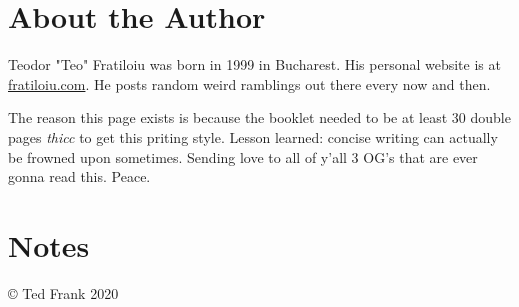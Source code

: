 \documentclass[11pt]{report}
\begin{document}
\newpage
\pagestyle{plain}

\newpage
\mbox{}
\newpage

\newpage
{}
\listoffigures
\newpage
{}
\listoftables

\newpage
\mbox{}
\newpage
\newpage
{}
\printbibliography

\newpage
\mbox{}
\newpage

\newpage
\section*{About the Author}
Teodor "Teo" Fratiloiu was born in 1999 in Bucharest. His personal website is at \href{fratiloiu.com}{fratiloiu.com}. He posts random weird ramblings out there every now and then. 
\par
The reason this page exists is because the booklet needed to be at least 30 double pages \textit{thicc} to get this priting style. Lesson learned: concise writing can actually be frowned upon sometimes. Sending love to all of y'all 3 OG's that are ever gonna read this. Peace.

\newpage
\mbox{}
\newpage


\newpage
\section*{Notes}
\newpage
\mbox{}
\newpage
\mbox{}
\newpage
\thispagestyle{empty}
\vspace*{\fill}
\centering
© Ted Frank 2020
\end{document}
